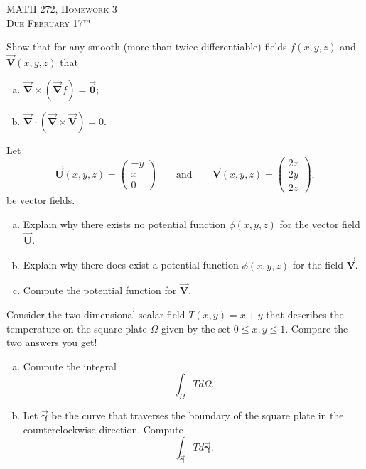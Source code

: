 \documentclass[12pt]{article} %
\newcommand{\grad}{\boldsymbol{\vec{\nabla}}}
\newcommand{\curvegamma}{\boldsymbol{\vec{\gamma}}}
\newcommand{\vecfieldV}{\boldsymbol{\vec{V}}}
\newcommand{\vecfieldU}{\boldsymbol{\vec{U}}}
\begin{document}
\begin{center}
   \textsc{\large MATH 272, Homework 3}\\
   \textsc{Due February 17$^\textrm{th}$}
\end{center}
\vspace{.5cm}


\begin{problem}
Show that for any smooth (more than twice differentiable) fields $f(x,y,z)$ and $\vecfieldV(x,y,z)$ that
\begin{enumerate}[(a)]
	\item $\grad \times \left(\grad f\right)=\boldsymbol{\vec{0}}$;
	\item $\grad \cdot \left(\grad \times \vecfieldV\right)=0$.
\end{enumerate}
\end{problem}

\begin{problem}
	Let 
	\[
	\vecfieldU(x,y,z) = \begin{pmatrix} -y \\ x \\ 0 \end{pmatrix} \qquad \textrm{and} \qquad \vecfieldV(x,y,z) = \begin{pmatrix} 2x \\ 2y \\ 2z \end{pmatrix},
	\] 
	be vector fields.  
	\begin{enumerate}[(a)]
		\item Explain why there exists no potential function $\phi(x,y,z)$ for the vector field $\vecfieldU$.
		\item Explain why there does exist a potential function $\phi(x,y,z)$ for the field $\vecfieldV$.
		\item Compute the potential function for $\vecfieldV$.
	\end{enumerate}
\end{problem}

\begin{problem}
Consider the two dimensional scalar field $T(x,y)=x+y$ that describes the temperature on the square plate $\Omega$ given by the set $0\leq x,y \leq 1$.  Compare the two answers you get!
\begin{enumerate}[(a)]
	\item Compute the integral
	\[
	\int_\Omega T d\Omega.
	\]
	\item Let $\curvegamma$ be the curve that traverses the boundary of the square plate in the counterclockwise direction.  Compute
	\[
	\int_{\curvegamma} T d\curvegamma. 
	\]
\end{enumerate}
\end{problem}
\end{document}
